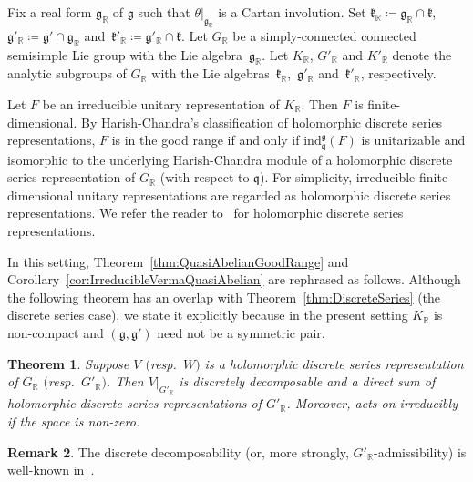 \documentclass[pdftex]{sigma}
\numberwithin{equation}{section}
\newtheorem{Theorem}{Theorem}[section]
\theoremstyle{definition}
\newtheorem{Remark}[Theorem]{Remark}
\newcommand{\Hom}{\mathrm{Hom}}
\newcommand{\BasicRing}[1]{\mathbb{#1}}
\newcommand{\RR}{\BasicRing{R}}
\newcommand{\lieC}[1]{\mathfrak{#1}}
\newcommand{\lie}[1]{\mathfrak{#1}}
\newcommand{\univ}[1]{\mathcal{U}(\lieC{#1})}
\newcommand{\ind}[2]{\mathrm{ind}^{\lieC{#1}}_{\lieC{#2}}}
\begin{document}
Fix a real form $\lie{g}_\RR$ of $\lie{g}$ such that $\theta|_{\lie{g}_\RR}$ is a Cartan involution.
Set $\lie{k}_\RR\coloneq \lie{g}_\RR \cap \lie{k}$, $\lie{g}'_\RR\coloneq \lie{g}'\cap \lie{g}_\RR$ and~${\lie{k}'_\RR\coloneq \lie{g}'_\RR \cap \lie{k}}$.
Let $G_\RR$ be a simply-connected connected semisimple Lie group with the Lie algebra~$\lie{g}_\RR$.
Let $K_\RR$, $G'_\RR$ and $K'_\RR$ denote the analytic subgroups of $G_\RR$ with the Lie algebras~$\lie{k}_\RR$,~$\lie{g}'_\RR$ and~$\lie{k}'_\RR$, respectively.

Let $F$ be an irreducible unitary representation of $K_\RR$.
Then $F$ is finite-dimensional.
By Harish-Chandra's classification of holomorphic discrete series representations, $F$ is in the good range if and only if
$\ind{g}{q}(F)$ is unitarizable and isomorphic to the underlying Harish-Chandra module of a holomorphic discrete series representation of $G_\RR$ (with respect to $\lie{q}$).
For simplicity, irreducible finite-dimensional unitary representations are regarded as holomorphic discrete series representations.
We refer the reader to~\cite[Chapter~VI]{Kn86} for holomorphic discrete series representations.

In this setting, Theorem~\ref{thm:QuasiAbelianGoodRange} and Corollary~\ref{cor:IrreducibleVermaQuasiAbelian} are rephrased as follows.
Although the following theorem has an overlap with Theorem~\ref{thm:DiscreteSeries} (the discrete series case),
we state it explicitly because in the present setting $K_\RR$ is non-compact and $(\lie{g}, \lie{g'})$ need not be a symmetric pair.

\begin{Theorem}\label{thm:IrreducibleHolomorphicDisc}
	Suppose $V$ $($resp.\ $W)$ is a holomorphic discrete series representation of $G_\RR$ $($resp.~$G'_\RR)$.
	Then $V|_{G'_\RR}$ is discretely decomposable and a direct sum of holomorphic discrete series representations of $G'_\RR$.
	Moreover, \smash{$\univ{g}^{G'}$} acts on \smash{$\Hom_{G'_\RR}\bigl(W, V|_{G'_\RR}\bigr)$} irreducibly if the space is non-zero.
\end{Theorem}

\begin{Remark}
	The discrete decomposability (or, more strongly, $G'_\RR$-admissibility) is well-known in~\cite[Theorem~7.4]{Ko98}.
\end{Remark}
\end{document}
